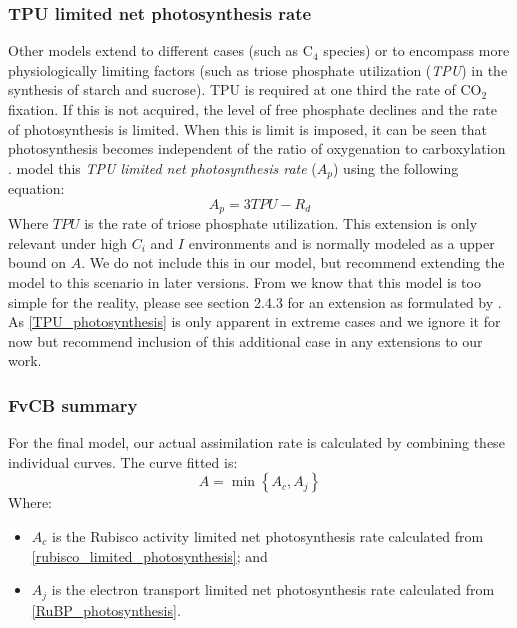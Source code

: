 \documentclass[11pt]{article} %
\begin{document}
\subsubsection{TPU limited net photosynthesis rate} \label{TPU_limited_photosynthesis}
Other models extend to different cases (such as C$_4$ species) or to encompass more physiologically limiting factors (such as triose phosphate utilization (\emph{TPU}) in the synthesis of starch and sucrose). TPU is required at one third the rate of CO$_2$ fixation. If this is not acquired, the level of free phosphate declines and the rate of photosynthesis is limited. When this is limit is imposed, it can be seen that photosynthesis becomes independent of the ratio of oxygenation to carboxylation \cite{ThomasD.SharkeyPhotosynthesisIntactLeaves1985}. \citet{SharkeyFittingphotosyntheticcarbon2007} model this \emph{TPU limited net photosynthesis rate} ($A_p$) using the following equation:
\begin{equation} \label{TPU_photosynthesis}
A_p = 3TPU - R_d
\end{equation}
Where $TPU$ is the rate of triose phosphate utilization. This extension is only relevant under high $C_i$ and $I$ environments and is normally modeled as a upper bound on $A$. We do not include this in our model, but recommend extending the model to this scenario in later versions. From \citet{CaemmererBiochemicalmodelsleaf2000} we know that this model is too simple for the reality, please see section 2.4.3 for an extension as formulated by \citet{HarleyimprovedmodelC31991}. As \eqref{TPU_photosynthesis} is only apparent in extreme cases and we ignore it for now but recommend inclusion of this additional case in any extensions to our work.

\subsubsection{FvCB summary}
For the final model, our actual assimilation rate is calculated by combining these individual curves. The curve fitted is:
\begin{equation} \label{FvCB_equation}
A = \min \left \{A_c, A_j\right \}
\end{equation}
Where:
\begin{itemize}
 \item $A_c$ is the Rubisco activity limited net photosynthesis rate calculated from \eqref{rubisco_limited_photosynthesis}; and
 \item $A_j$ is the electron transport limited net photosynthesis rate calculated from \eqref{RuBP_photosynthesis}.
\end{itemize}
\end{document}
